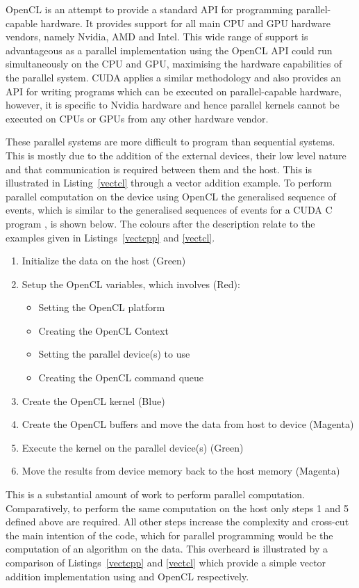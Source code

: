 \documentclass{sig-alternate-05-2015}
\begin{document}
OpenCL is an attempt to provide a standard API for programming parallel-capable
hardware. It provides support for all main CPU and GPU hardware vendors, namely
Nvidia, AMD and Intel. This wide range of support is advantageous as a 
parallel implementation using the OpenCL API could run simultaneously on the CPU
and GPU, maximising the hardware capabilities of the parallel system. CUDA applies 
a similar methodology and also provides an API for writing programs which can be 
executed on parallel-capable hardware, however, it is specific to Nvidia hardware 
and hence parallel kernels cannot be executed on CPUs or GPUs from any other 
hardware vendor.

These parallel systems are more difficult to program than sequential 
systems. This is mostly due to the addition of the external devices, 
their low level nature and that communication is required between them and the
host. This is illustrated in Listing~\ref{vectcl} through a vector addition
example. To perform parallel computation on the device using OpenCL 
the generalised sequence of events, which is similar to the generalised sequences 
of events for a CUDA C program \cite{harris:cuda}, is shown below. The colours after the 
description relate to the examples given in Listings~\ref{vectcpp} and
\ref{vectcl}.
\begin{enumerate}
	\item{Initialize the data on the host (Green)}
	\item{Setup the OpenCL variables, which involves (Red):
			\begin{itemize}
				\item{Setting the OpenCL platform }
				\item{Creating the OpenCL Context }
				\item{Setting the parallel device(s) to use }
				\item{Creating the OpenCL command queue }
		\end{itemize} }
	\item{Create the OpenCL kernel (Blue)}
	\item{Create the OpenCL buffers and move the data from host to
		device (Magenta)}
	\item{Execute the kernel on the parallel device(s) (Green)}
	\item{Move the results from device memory back to the host
		memory (Magenta)}
\end{enumerate}

This is a substantial amount of work to perform parallel computation.
Comparatively, to perform the same computation on the host only 
steps 1 and 5 defined above are required. All other steps increase
the complexity and cross-cut the main intention of
the \CPP code, which for parallel programming would be the computation of 
an algorithm on the data. This overheard is 
illustrated by a comparison of Listings~\ref{vectcpp} and \ref{vectcl} which 
provide a simple vector addition implementation using \CPP and OpenCL respectively.
\end{document}
